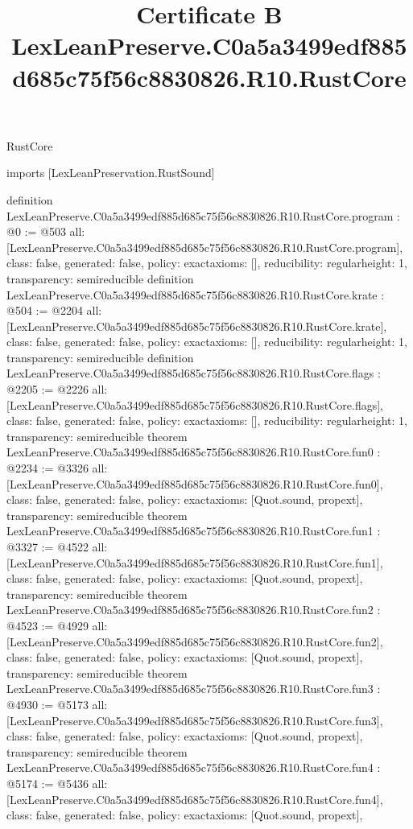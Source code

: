 \begin{lexlean}{RustCore}
\title{Certificate B LexLeanPreserve.C0a5a3499edf885d685c75f56c8830826.R10.RustCore}
\begin{coremodule}
imports [LexLeanPreservation.RustSound]

definition LexLeanPreserve.C0a5a3499edf885d685c75f56c8830826.R10.RustCore.program : @0 := @503 {
  all: [LexLeanPreserve.C0a5a3499edf885d685c75f56c8830826.R10.RustCore.program],
  class: false,
  generated: false,
  policy: exact{axioms: []},
  reducibility: regular{height: 1},
  transparency: semireducible
}
definition LexLeanPreserve.C0a5a3499edf885d685c75f56c8830826.R10.RustCore.krate : @504 := @2204 {
  all: [LexLeanPreserve.C0a5a3499edf885d685c75f56c8830826.R10.RustCore.krate],
  class: false,
  generated: false,
  policy: exact{axioms: []},
  reducibility: regular{height: 1},
  transparency: semireducible
}
definition LexLeanPreserve.C0a5a3499edf885d685c75f56c8830826.R10.RustCore.flags : @2205 := @2226 {
  all: [LexLeanPreserve.C0a5a3499edf885d685c75f56c8830826.R10.RustCore.flags],
  class: false,
  generated: false,
  policy: exact{axioms: []},
  reducibility: regular{height: 1},
  transparency: semireducible
}
theorem LexLeanPreserve.C0a5a3499edf885d685c75f56c8830826.R10.RustCore.fun0 : @2234 := @3326 {
  all: [LexLeanPreserve.C0a5a3499edf885d685c75f56c8830826.R10.RustCore.fun0],
  class: false,
  generated: false,
  policy: exact{axioms: [Quot.sound, propext]},
  transparency: semireducible
}
theorem LexLeanPreserve.C0a5a3499edf885d685c75f56c8830826.R10.RustCore.fun1 : @3327 := @4522 {
  all: [LexLeanPreserve.C0a5a3499edf885d685c75f56c8830826.R10.RustCore.fun1],
  class: false,
  generated: false,
  policy: exact{axioms: [Quot.sound, propext]},
  transparency: semireducible
}
theorem LexLeanPreserve.C0a5a3499edf885d685c75f56c8830826.R10.RustCore.fun2 : @4523 := @4929 {
  all: [LexLeanPreserve.C0a5a3499edf885d685c75f56c8830826.R10.RustCore.fun2],
  class: false,
  generated: false,
  policy: exact{axioms: [Quot.sound, propext]},
  transparency: semireducible
}
theorem LexLeanPreserve.C0a5a3499edf885d685c75f56c8830826.R10.RustCore.fun3 : @4930 := @5173 {
  all: [LexLeanPreserve.C0a5a3499edf885d685c75f56c8830826.R10.RustCore.fun3],
  class: false,
  generated: false,
  policy: exact{axioms: [Quot.sound, propext]},
  transparency: semireducible
}
theorem LexLeanPreserve.C0a5a3499edf885d685c75f56c8830826.R10.RustCore.fun4 : @5174 := @5436 {
  all: [LexLeanPreserve.C0a5a3499edf885d685c75f56c8830826.R10.RustCore.fun4],
  class: false,
  generated: false,
  policy: exact{axioms: [Quot.sound, propext]},
}
\end{coremodule}
\end{lexlean}
